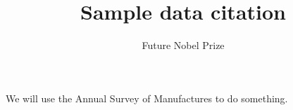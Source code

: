 \documentclass[10pt,letterpaper]{article}
\title{Sample data citation}
\author{Future Nobel Prize}
\begin{document}
\maketitle
We will use the Annual Survey of Manufactures {\color{red} \parencite{cms1}} to do something.

\printbibliography	
\end{document}
